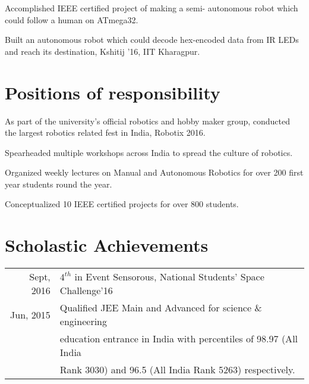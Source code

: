 \documentclass[letterpaper]{aman}
\begin{document}
\begin{minipage}[t]{0.599\textwidth}
\begin{tightemize}
\item Accomplished IEEE certified project of making a semi- autonomous robot which could follow a human on ATmega32.
\end{tightemize}
\sectionsep

\begin{tightemize}
\item Built an autonomous robot which could decode hex-encoded data from IR LEDs and reach its destination, Kshitij ’16, IIT Kharagpur.
\end{tightemize}
\sectionsep

\section{Positions of responsibility}

\begin{tightemize}
\item As part of the university’s official robotics and hobby maker group, conducted the largest robotics related fest in India, Robotix 2016.
\item Spearheaded multiple workshops across India to spread the culture of robotics.
\end{tightemize}
\sectionsep 

\begin{tightemize}
\item Organized weekly lectures on Manual and Autonomous Robotics for over 200 first year students round the year.
\item Conceptualized 10 IEEE certified projects for over 800 students.
\end{tightemize}
\sectionsep 

\section{Scholastic Achievements}
\begin{tabular}{rl}
Sept, 2016 & $4^{th}$ in Event Sensorous, National Students' Space Challenge'16\\
Jun, 2015 & Qualified JEE Main and Advanced for science \& engineering\\
         &  education entrance in India with percentiles of 98.97 (All India \\
& Rank 3030) and 96.5 (All India Rank 5263) respectively.\\
\end{tabular}


\end{minipage} 
\end{document}
